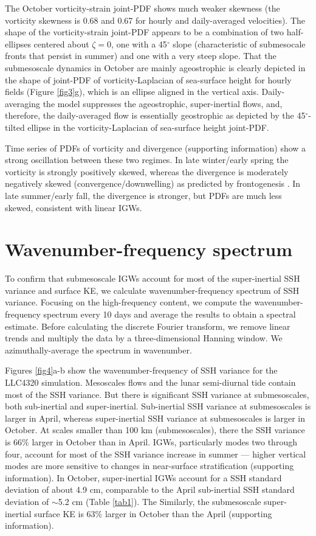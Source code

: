 \documentclass[grl]{agutex2015}
\begin{document}
\begin{article}
The October vorticity-strain joint-PDF shows much weaker skewness (the vorticity skewness
is 0.68 and 0.67 for hourly and daily-averaged velocities). The shape of the
vorticity-strain joint-PDF  appears to be a combination of two half-ellipses centered
about $\zeta=0$, one with a 45$^\circ$ slope (characteristic of submesocale fronts
that persist in summer) and one with a very steep slope.
That the submesoscale dynamics in October are mainly ageostrophic is clearly depicted
in the shape of joint-PDF of vorticity-Laplacian of sea-surface height for hourly fields
 (Figure \ref{fig3}g), which is an ellipse aligned in the vertical axis.
Daily-averaging the model suppresses the ageostrophic, super-inertial flows, and, therefore,
the daily-averaged flow is essentially geostrophic as depicted by the 45$^\circ$-tilted
ellipse in the vorticity-Laplacian of sea-surface height joint-PDF.

 Time series of PDFs of vorticity and divergence (supporting information) show
 a strong oscillation between these two regimes. In late winter/early spring
 the vorticity is strongly positively skewed, whereas the divergence is moderately
 negatively skewed (convergence/downwelling) as predicted by frontogenesis \citep[e.g., ][]{mcwilliams2016}
. In late summer/early fall, the divergence is stronger, but PDFs are much less skewed,
consistent with linear IGWs.

\section{Wavenumber-frequency spectrum}
To confirm that submesoscale IGWs account for most of the super-inertial SSH variance
and surface KE, we calculate wavenumber-frequency spectrum of SSH variance. Focusing on
the high-frequency
content, we compute the wavenumber-frequency spectrum  every 10 days and average
the results to obtain a spectral estimate. Before calculating the discrete Fourier
transform, we
remove linear trends and multiply the data by a three-dimensional Hanning window.
We azimuthally-average the spectrum in wavenumber.

Figures \ref{fig4}a-b show the wavenumber-frequency of SSH variance for the LLC4320
simulation. Mesoscales flows and the lunar semi-diurnal tide contain most of the
SSH variance. But there is significant SSH variance at submesoscales, both sub-inertial
and super-inertial. Sub-inertial SSH variance at submesoscales is larger in April, whereas
super-inertial SSH variance at submesoscales is larger in October. At scales smaller
than 100 km (submesoscales), there the SSH variance is 66$\%$ larger in October than in April.
IGWs, particularly modes two through four, account for most of the SSH variance
increase in summer --- higher vertical
modes are more sensitive to changes in near-surface stratification (supporting information).
In October, super-inertial IGWs account for a SSH standard deviation of about 4.9 cm,
comparable to the April sub-inertial SSH standard deviation of $\sim$5.2 cm (Table \ref{tab1}).
The
Similarly, the submesoscale super-inertial surface KE is 63$\%$ larger in October
than the April (supporting information).


\end{article}
\end{document}
